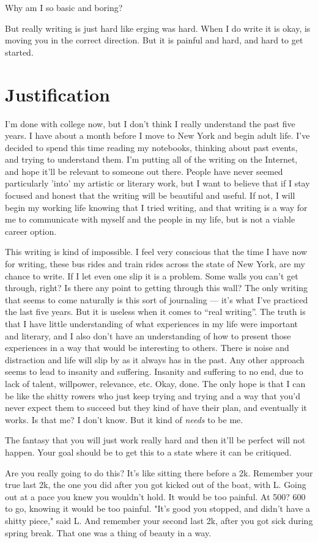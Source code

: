 \documentclass[12pt]{article}
\begin{document}
Why am I so basic and boring?

But really writing is just hard like erging was hard.  When I do write it is
okay, is moving you in the correct direction.  But it is painful and hard, and
hard to get started.

\section{Justification}
I'm done with college now, but I don't think I really understand the past five
years.  I have about a month before I move to New York and begin adult life.
I've decided to spend this time reading my notebooks, thinking about past
events, and trying to understand them.  I'm putting all of the writing on the
Internet, and hope it'll be relevant to someone out there.  People have never
seemed particularly 'into' my artistic or literary work, but I want to believe
that if I stay focused and honest that the writing will be beautiful and
useful.  If not, I will begin my working life knowing that I tried writing, and
that writing is a way for me to communicate with myself and the people in my
life, but is not a viable career option.

This writing is kind of impossible.  I feel very conscious that the time I have
now for writing, these bus rides and train rides across the state of New York,
are my chance to write.  If I let even one slip it is a problem.  Some walls you
can't get through, right?  Is there any point to getting through this wall?  The
only writing that seems to come naturally is this sort of journaling --- it's
what I've practiced the last five years.  But it is useless when it comes to
``real writing''.  The truth is that I have little understanding of what
experiences in my life were important and literary, and I also don't have an
understanding of how to present those experiences in a way that would be
interesting to others.  There is noise and distraction and life will slip by as
it always has in the past.  Any other approach seems to lead to insanity and
suffering.  Insanity and suffering to no end, due to lack of talent, willpower,
relevance, etc.  Okay, done.  The only hope is that I can be like the shitty
rowers who just keep trying and trying and a way that you'd never expect them to
succeed but they kind of have their plan, and eventually it works.  Is that me?
I don't know.  But it kind of \textit{needs} to be me.

The fantasy that you will just work really hard and then it'll be perfect will
not happen.  Your goal should be to get this to a state where it can be
critiqued.

Are you really going to do this?  It's like sitting there before a 2k.  Remember
your true last 2k, the one you did after you got kicked out of the boat, with
L.  Going out at a pace you knew you wouldn't hold.  It would be too
painful.  At 500?  600 to go, knowing it would be too painful.  "It's good you
stopped, and didn't have a shitty piece," said L.  And remember your second last
2k, after you got sick during spring break.  That one was a thing of beauty in a
way.  
\end{document}
